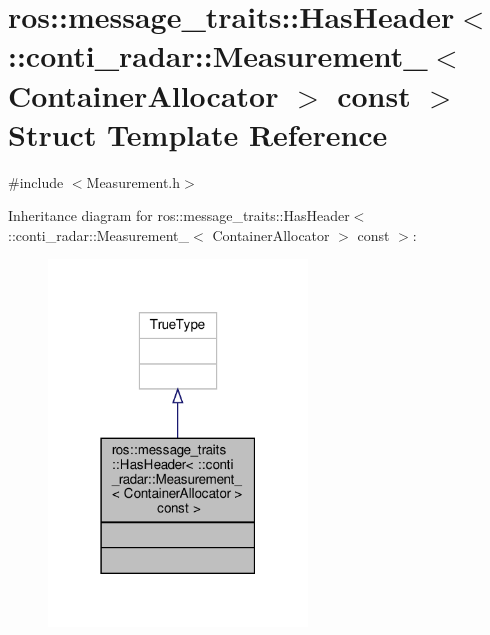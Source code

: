 \hypertarget{structros_1_1message__traits_1_1HasHeader_3_01_1_1conti__radar_1_1Measurement___3_01ContainerAllocator_01_4_01const_01_4}{}\section{ros\+:\+:message\+\_\+traits\+:\+:Has\+Header$<$ \+:\+:conti\+\_\+radar\+:\+:Measurement\+\_\+$<$ Container\+Allocator $>$ const $>$ Struct Template Reference}
\label{structros_1_1message__traits_1_1HasHeader_3_01_1_1conti__radar_1_1Measurement___3_01ContainerAllocator_01_4_01const_01_4}


{\ttfamily \#include $<$Measurement.\+h$>$}



Inheritance diagram for ros\+:\+:message\+\_\+traits\+:\+:Has\+Header$<$ \+:\+:conti\+\_\+radar\+:\+:Measurement\+\_\+$<$ Container\+Allocator $>$ const $>$\+:\nopagebreak
\begin{figure}[H]
\begin{center}
\leavevmode
\includegraphics[width=195pt]{d6/d1c/structros_1_1message__traits_1_1HasHeader_3_01_1_1conti__radar_1_1Measurement___3_01ContainerAlld06e4cbe4ab50fe6aacff22567806e9f}
\end{center}
\end{figure}


